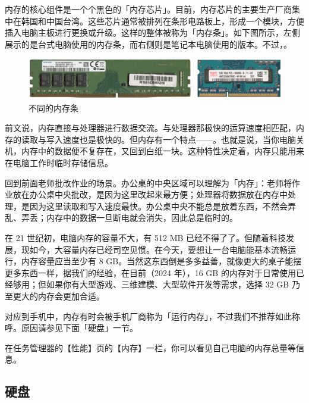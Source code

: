 内存的核心组件是一个个黑色的「内存芯片」。目前，内存芯片的主要生产厂商集中在韩国和中国台湾。这些芯片通常被排列在条形电路板上，形成一个模块，方便插入电脑主板进行更换或升级。这样的整体被称为「内存条」。如下图所示，左侧展示的是台式电脑使用的内存条，而右侧则是笔记本电脑使用的版本。不过，。

\begin{figure}[htb!]
  \centering
  \includegraphics[width=.9\textwidth]{assets/basic/Two_memories.png}
  \caption{不同的内存条}
  \label{fig:RAMs}
\end{figure}

前文说，内存直接与处理器进行数据交流。与处理器那极快的运算速度相匹配，内存的读取与写入速度也是极快的。但内存有一个特点——。也就是说，当你电脑关机，内存中的数据便不复存在，又回到白纸一块。这种特性决定着，内存只能用来在电脑工作时临时存储信息。

回到前面老师批改作业的场景。办公桌的中央区域可以理解为「内存」：老师将作业放在办公桌中央批改，是因为这里改起来最方便；处理器将数据放在内存中处理，是因为这里读取和写入速度最快。办公桌中央不能总是放着东西，不然会弄乱、弄丢；内存中的数据一旦断电就会消失，因此总是临时的。

在 21 世纪初，电脑内存的容量不大，有 512 MB 已经不得了了。但随着科技发展，现如今，大容量内存已经司空见惯。在今天，要想让一台电脑能基本流畅运行，内存容量应当至少有 8 GB。当然这东西倒是多多益善，就像更大的桌子能摆更多东西一样，据我们的经验，在目前（2024 年），16 GB 的内存对于日常使用已经够用；但如果你有大型游戏、三维建模、大型软件开发等需求，选择 32 GB 乃至更大的内存会更加合适。

\begin{note}
  对应到手机中，内存有时会被手机厂商称为「运行内存」，不过我们不推荐如此称呼。原因请参见下面「硬盘」一节。
\end{note}

在任务管理器的【性能】页的【内存】一栏，你可以看见自己电脑的内存总量等信息。

\subsection{硬盘}

